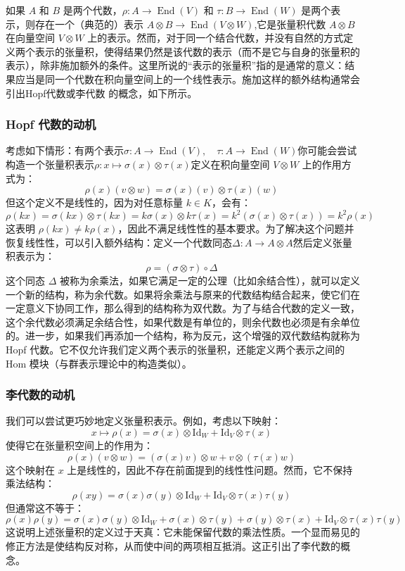 如果 $A$ 和 $B$ 是两个代数，$\rho : A \to \operatorname{End}(V)$ 和 $\tau : B \to \operatorname{End}(W)$ 是两个表示，则存在一个（典范的）表示
$A \otimes B \to \operatorname{End}(V \otimes W)$,它是张量积代数 $A \otimes B$ 在向量空间 $V \otimes W$ 上的表示。然而，对于同一个结合代数，并没有自然的方式定义两个表示的张量积，使得结果仍然是该代数的表示（而不是它与自身的张量积的表示），除非施加额外的条件。这里所说的“表示的张量积”指的是通常的意义：结果应当是同一个代数在积向量空间上的一个线性表示。施加这样的额外结构通常会引出Hopf代数或李代数 的概念，如下所示。
\subsubsection{Hopf 代数的动机}
考虑如下情形：有两个表示$\sigma : A \to \operatorname{End}(V), \quad \tau : A \to \operatorname{End}(W)$你可能会尝试构造一个张量积表示$\rho : x \mapsto \sigma(x) \otimes \tau(x)$定义在积向量空间 $V \otimes W$ 上的作用方式为：
$$
\rho(x)(v \otimes w) = \sigma(x)(v) \otimes \tau(x)(w)~
$$
但这个定义不是线性的，因为对任意标量 $k \in K$，会有：
$$
\rho(kx) = \sigma(kx) \otimes \tau(kx) = k \sigma(x) \otimes k \tau(x) = k^2 (\sigma(x) \otimes \tau(x)) = k^2 \rho(x)~
$$
这表明 $\rho(kx) \ne k \rho(x)$，因此不满足线性性的基本要求。为了解决这个问题并恢复线性性，可以引入额外结构：定义一个代数同态$\Delta: A \to A \otimes A$然后定义张量积表示为：
$$
\rho = (\sigma \otimes \tau) \circ \Delta~
$$
这个同态 $\Delta$ 被称为余乘法，如果它满足一定的公理（比如余结合性），就可以定义一个新的结构，称为余代数。如果将余乘法与原来的代数结构结合起来，使它们在一定意义下协同工作，那么得到的结构称为双代数。为了与结合代数的定义一致，这个余代数必须满足余结合性，如果代数是有单位的，则余代数也必须是有余单位的。进一步，如果我们再添加一个结构，称为反元，这个增强的双代数结构就称为Hopf 代数。它不仅允许我们定义两个表示的张量积，还能定义两个表示之间的 Hom 模块（与群表示理论中的构造类似）。
\subsubsection{李代数的动机}
我们可以尝试更巧妙地定义张量积表示。例如，考虑以下映射：
$$
x \mapsto \rho(x) = \sigma(x) \otimes \mathrm{Id}_W + \mathrm{Id}_V \otimes \tau(x)~
$$
使得它在张量积空间上的作用为：
$$
\rho(x)(v \otimes w) = (\sigma(x)v) \otimes w + v \otimes (\tau(x)w)~
$$
这个映射在 $x$ 上是线性的，因此不存在前面提到的线性性问题。然而，它不保持乘法结构：
$$
\rho(xy) = \sigma(x)\sigma(y) \otimes \mathrm{Id}_W + \mathrm{Id}_V \otimes \tau(x)\tau(y)~
$$
但通常这不等于：
$$
\rho(x)\rho(y) = \sigma(x)\sigma(y) \otimes \mathrm{Id}_W + \sigma(x) \otimes \tau(y) + \sigma(y) \otimes \tau(x) + \mathrm{Id}_V \otimes \tau(x)\tau(y)~
$$
这说明上述张量积的定义过于天真：它未能保留代数的乘法性质。一个显而易见的修正方法是使结构反对称，从而使中间的两项相互抵消。这正引出了李代数的概念。

